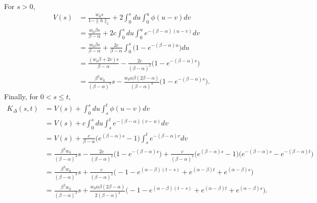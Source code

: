 \documentclass[aos]{imsart}
\theoremstyle{plain}
\theoremstyle{remark}
\newcommand{\1}{1}
\begin{document}
For $s>0$,
\begin{align*}
V(s)&=\frac{w_0 s}{1-\|h\|_1}+2\int_0^sdu\int_0^u\phi(u-v)dv\\
&=\frac{w_0\beta s}{\beta-\alpha}+2c\int_0^sdu\int_0^ue^{-(\beta-\alpha)(u-v)}dv\\
&=\frac{w_0\beta s}{\beta-\alpha}+\frac{2c}{\beta-\alpha}\int_0^s\big(1-e^{-(\beta-\alpha)u}\big)du\\
&=\frac{(w_0\beta+2c) s}{\beta-\alpha}-\frac{2c}{(\beta-\alpha)^2}\big(1-e^{-(\beta-\alpha)s}\big)\\
&=\frac{\beta^3w_0}{(\beta-\alpha)^3}s-\frac{w_0\alpha\beta(2\beta-\alpha)}{(\beta-\alpha)^4}\big(1-e^{-(\beta-\alpha)s}\big).
\end{align*}
Finally, for $0<s\leq t,$
\begin{align*}
K_\Delta(s,t)&=V(s)+\int_0^sdu\int_s^t\phi(u-v)dv\\
&=V(s)+c\int_0^sdu\int_s^te^{-(\beta-\alpha)(v-u)}dv\\
&=V(s)+\frac{c}{\beta-\alpha}\big(e^{(\beta-\alpha)s}-1\big)\int_s^te^{-(\beta-\alpha)v}dv\\
&=\frac{\beta^3w_0}{(\beta-\alpha)^3}s-\frac{2c}{(\beta-\alpha)^2}\big(1-e^{-(\beta-\alpha)s}\big)+\frac{c}{(\beta-\alpha)^2}\big(e^{(\beta-\alpha)s}-1\big)\big(e^{-(\beta-\alpha)s}-e^{-(\beta-\alpha)t}\big)\\
&=\frac{\beta^3w_0}{(\beta-\alpha)^3}s+\frac{c}{(\beta-\alpha)^2}\big(-1-e^{(\alpha-\beta)(t-s)}+e^{(\alpha-\beta)t}+e^{(\alpha-\beta)s}\big)\\
&=\frac{\beta^3w_0}{(\beta-\alpha)^3}s+\frac{w_0\alpha\beta(2\beta-\alpha)}{2(\beta-\alpha)^4}\big(-1-e^{(\alpha-\beta)(t-s)}+e^{(\alpha-\beta)t}+e^{(\alpha-\beta)s}\big).
\end{align*}
\fi


\end{document}
